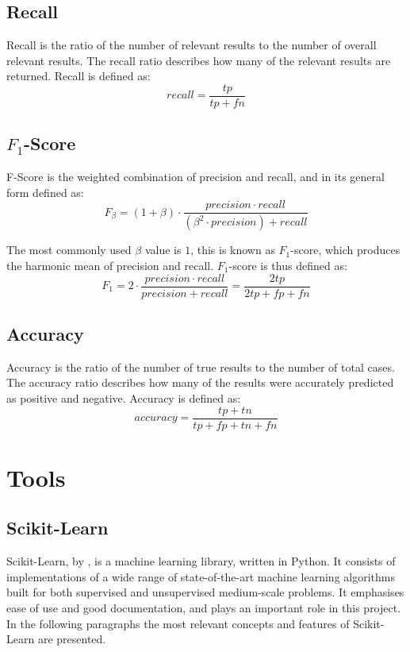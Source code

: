 \subsection*{Recall}
Recall is the ratio of the number of relevant results to the number of overall relevant results. The recall ratio describes how many of the relevant results are returned.  Recall is defined as:
\begin{equation*}
    recall = \frac{tp}{tp+fn}
\end{equation*}

\subsection*{$F_{1}$-Score}
F-Score is the weighted combination of precision and recall, and in its general form defined as:
\begin{equation*}
    F_{\beta} = (1+\beta)\cdot\frac{precision\cdot recall}{(\beta ^2 \cdot precision) + recall}
\end{equation*}

The most commonly used $\beta$ value is $1$, this is known as $F_{1}$-score, which produces the harmonic mean of precision and recall. $F_{1}$-score is thus defined as:
\begin{equation*}
    F_{1} = 2\cdot\frac{precision\cdot recall}{precision + recall} = \frac{2tp}{2tp + fp + fn}
\end{equation*}

\subsection*{Accuracy}
Accuracy is the ratio of the number of true results to the number of total cases. The accuracy ratio describes how many of the results were accurately predicted as positive and negative. Accuracy is defined as:
\begin{equation*}
    accuracy = \frac{tp+tn}{tp+fp+tn+fn}
\end{equation*}


\section{Tools}
\label{sec:tools}

\subsection{Scikit-Learn}
\label{sec:background_scikit}
Scikit-Learn, by \cite{scikit-learn}, is a machine learning library, written in Python. It consists of implementations of a wide range of state-of-the-art machine learning algorithms built for both supervised and unsupervised medium-scale problems. It emphasises ease of use and good documentation, and plays an important role in this project. In the following paragraphs the most relevant concepts and features of Scikit-Learn are presented.

